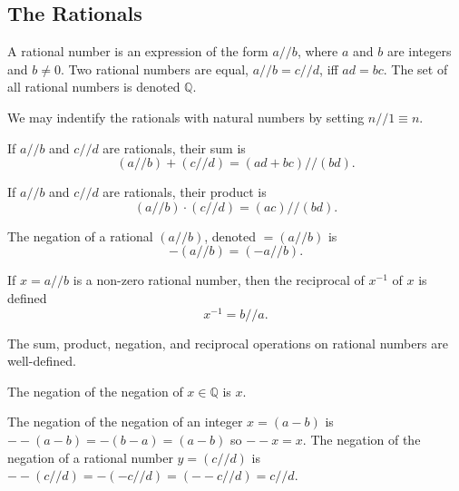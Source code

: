 \documentclass{article}
\begin{document}
\subsection{The Rationals}
\begin{definition}
	A rational number is an expression of the form \(a//b\), where \(a\) and \(b\) are integers and \(b\neq 0\). Two rational numbers are equal, \(a//b=c//d\), iff \(ad=bc\). The set of all rational numbers is denoted \(\mathbb{Q}\).
\end{definition}
\begin{remark}
We may indentify the rationals with natural numbers by setting \(n//1\equiv n\).
\end{remark}
\begin{definition}
	If \(a//b\) and \(c//d\) are rationals, their sum is
	\begin{equation*}
		(a//b)+(c//d)=(ad+bc)//(bd).
	\end{equation*}
\end{definition}
\begin{definition}
	If \(a//b\) and \(c//d\) are rationals, their product is
	\begin{equation*}
		(a//b)\cdot(c//d)=(ac)//(bd).
	\end{equation*}
\end{definition}
\begin{definition}
	The negation of a rational \((a//b)\), denoted \(=(a//b)\) is
	\begin{equation*}
		-(a//b)=(-a//b).
	\end{equation*}
\end{definition}
\begin{definition}
	If \(x=a//b\) is a non-zero rational number, then the reciprocal of \(x^{-1}\) of \(x\) is defined
	\begin{equation*}
		x^{-1}=b//a.
	\end{equation*}
\end{definition}
\begin{lemma}
	The sum, product, negation, and reciprocal operations on rational numbers are well-defined.
\end{lemma}
\begin{proposition}
	\label{doublenegation}
	The negation of the negation of \(x\in\mathbb{Q}\) is \(x\).
\end{proposition}
\begin{IEEEproof}
	The negation of the negation of an integer \(x=(a-b)\) is \(--(a-b)=-(b-a)=(a-b)\) so \(--x=x\). The negation of the negation of a rational number \(y=(c//d)\) is \(--(c//d)=-(-c//d)=(--c//d)=c//d\).
\end{IEEEproof}
\end{document}
